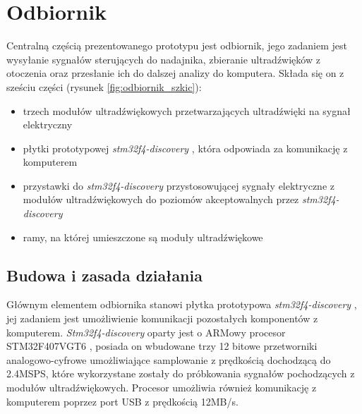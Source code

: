 \chapter{Odbiornik}


Centralną częścią prezentowanego prototypu jest odbiornik,
jego zadaniem jest wysyłanie sygnałów sterujących do nadajnika, zbieranie ultradźwięków z otoczenia oraz przesłanie
ich do dalszej analizy do komputera.
Składa się on z sześciu części (rysunek \ref{fig:odbiornik_szkic}):

\begin{itemize}
 \item trzech modułów ultradźwiękowych przetwarzających ultradźwięki na sygnał elektryczny
 \item płytki prototypowej \textit{stm32f4-discovery} \cite{bib:stm32f4Discovery}, która odpowiada za komunikację z komputerem
 \item przystawki do \textit{stm32f4-discovery} przystosowującej sygnały elektryczne z modułów ultradźwiękowych
  do poziomów akceptowalnych przez \textit{stm32f4-discovery}
 \item ramy, na której umieszczone są moduły ultradźwiękowe
\end{itemize}




\section{Budowa i zasada działania}

Głównym elementem odbiornika stanowi płytka prototypowa \textit{stm32f4-discovery} \cite{bib:stm32f4Discovery},
jej zadaniem jest umożliwienie komunikacji pozostałych komponentów z komputerem.
\textit{Stm32f4-discovery} oparty jest o ARMowy procesor STM32F407VGT6 \cite{bib:stm32f407}, posiada on wbudowane trzy 12 bitowe przetworniki
analogowo-cyfrowe umożliwiające samplowanie z prędkością dochodzącą do 2.4MSPS, które wykorzystane zostały do próbkowania
sygnałów pochodzących z modułów ultradźwiękowych. Procesor umożliwia również komunikację z komputerem poprzez 
port USB z prędkością 12MB/s.

